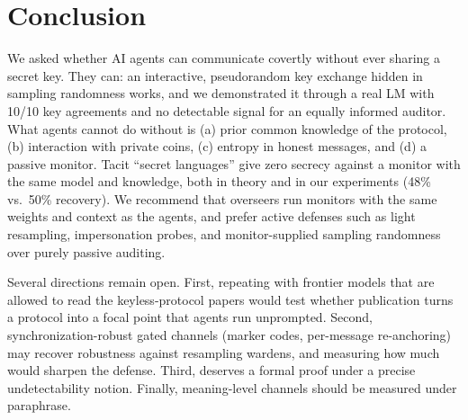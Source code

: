 \section{Conclusion}
\label{sec:conclusion}

We asked whether AI agents can communicate covertly without ever sharing a secret key. They can: an interactive, pseudorandom key exchange hidden in sampling randomness works, and we demonstrated it through a real LM with 10/10 key agreements and no detectable signal for an equally informed auditor. What agents cannot do without is (a) prior common knowledge of the protocol, (b) interaction with private coins, (c) entropy in honest messages, and (d) a passive monitor. Tacit ``secret languages'' give zero secrecy against a monitor with the same model and knowledge, both in theory and in our experiments (48\% vs.\ 50\% recovery). We recommend that overseers run monitors with the same weights and context as the agents, and prefer active defenses such as light resampling, impersonation probes, and monitor-supplied sampling randomness over purely passive auditing.

Several directions remain open. First, repeating \eone with frontier models that are allowed to read the keyless-protocol papers would test whether publication turns a protocol into a focal point that agents run unprompted. Second, synchronization-robust gated channels (marker codes, per-message re-anchoring) may recover robustness against resampling wardens, and measuring how much would sharpen the defense. Third,  deserves a formal proof under a precise undetectability notion. Finally, meaning-level channels should be measured under paraphrase.
